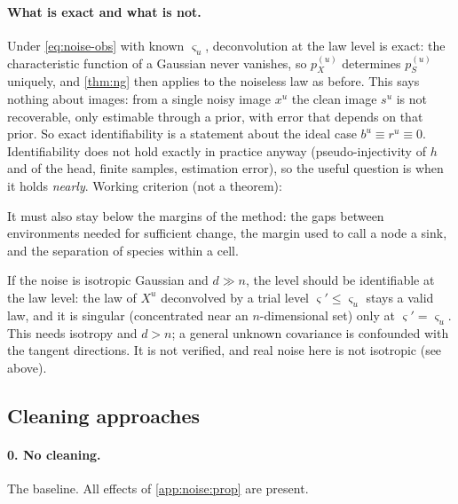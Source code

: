 \paragraph{What is exact and what is not.}
Under \cref{eq:noise-obs} with known $\varsigma_u$, deconvolution at the law level is exact: the
characteristic function of a Gaussian never vanishes, so $p^{(u)}_X$ determines $p^{(u)}_S$ uniquely, and
\cref{thm:ng} then applies to the noiseless law as before. This says nothing about images: from a
single noisy image $x^u$ the clean image $s^u$ is not recoverable, only estimable through a prior, with
error that depends on that prior. So exact identifiability is a statement about the ideal case
$b^u\equiv r^u\equiv0$.
Identifiability does not hold exactly in practice anyway (pseudo-injectivity of $h$ and of the head,
finite samples, estimation error), so the useful question is when it holds \emph{nearly}. Working
criterion (not a theorem):

\noindent\hspace*{1cm}

It must also stay below the margins of the method: the gaps between environments needed for sufficient
change, the margin used to call a node a sink, and the separation of species within a cell.
\vspace{\parskip}
\begin{remark}
If the noise is isotropic Gaussian and $d\gg n$, the level should be identifiable at the law level: the
law of $X^u$ deconvolved by a trial level $\varsigma'\le\varsigma_u$ stays a valid law, and it is
singular (concentrated near an $n$-dimensional set) only at $\varsigma'=\varsigma_u$. This needs
isotropy and $d>n$; a general unknown covariance is confounded with the tangent directions. It is not
verified, and real noise here is not isotropic (see above).
\end{remark}

\subsection{Cleaning approaches}
\label{app:noise:methods}

\paragraph{0. No cleaning.} The baseline. All effects of \cref{app:noise:prop} are present.

